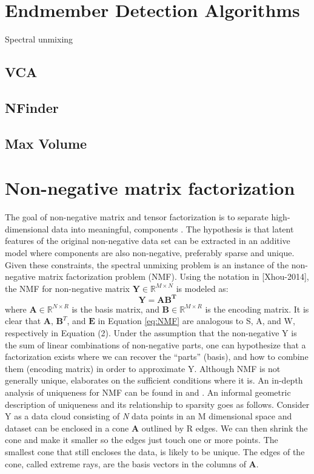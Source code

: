 \section{Endmember Detection Algorithms}
Spectral unmixing 
\subsection{VCA}
\subsection{NFinder}
\subsection{Max Volume}
\section{Non-negative matrix factorization}
The goal of non-negative matrix and tensor factorization is to separate high-dimensional data into meaningful, components \cite{lee_algorithms_2000}.  The hypothesis is that latent features of the original non-negative data set can be extracted in an additive model where components are also non-negative, preferably sparse and unique.  Given these constraints, the spectral unmixing problem is an instance of the non-negative matrix factorization problem (NMF).  Using the notation in [Xhou-2014], the NMF for non-negative matrix $\mathbf{Y} \in \mathbb{R}^{M \times N}$ is modeled as:
\begin{equation}\label{eq:NMF}
	\mathbf{Y = AB^T}
\end{equation}
where $\mathbf{A} \in \mathbb{R}^{N\times R}$
is the basis matrix, and 
$\mathbf{B} \in \mathbb{R}^{M\times R}$ 
is the encoding matrix.  It is clear that \textbf{A}, $\mathbf{B}^T$, and $\mathbf{E}$ in Equation \eqref{eq:NMF} are analogous to S, A, and W, respectively in Equation (2).  Under the assumption that the non-negative Y is the sum of linear combinations of non-negative parts, one can hypothesize that a factorization exists where we can recover the “parts” (basis), and how to combine them (encoding matrix) in order to approximate Y.
Although NMF is not generally unique, \cite{donoho_when_2004} elaborates on the sufficient conditions where it is.  An in-depth analysis of uniqueness for NMF can be found in \cite{sidiropoulos_} and \cite{huang_non-negative_2014}.  An informal geometric description of uniqueness and its relationship to sparsity goes as follows.  Consider Y as a data cloud consisting of \textit{N} data points in an M dimensional space and dataset can be enclosed in a cone \textbf{A} outlined by R edges.  We can then shrink the cone and make it smaller so the edges just touch one or more points.  The smallest cone that still encloses the data, is likely to be unique.  The edges of the cone, called extreme rays, are the basis vectors in the columns of \textbf{A}.  
